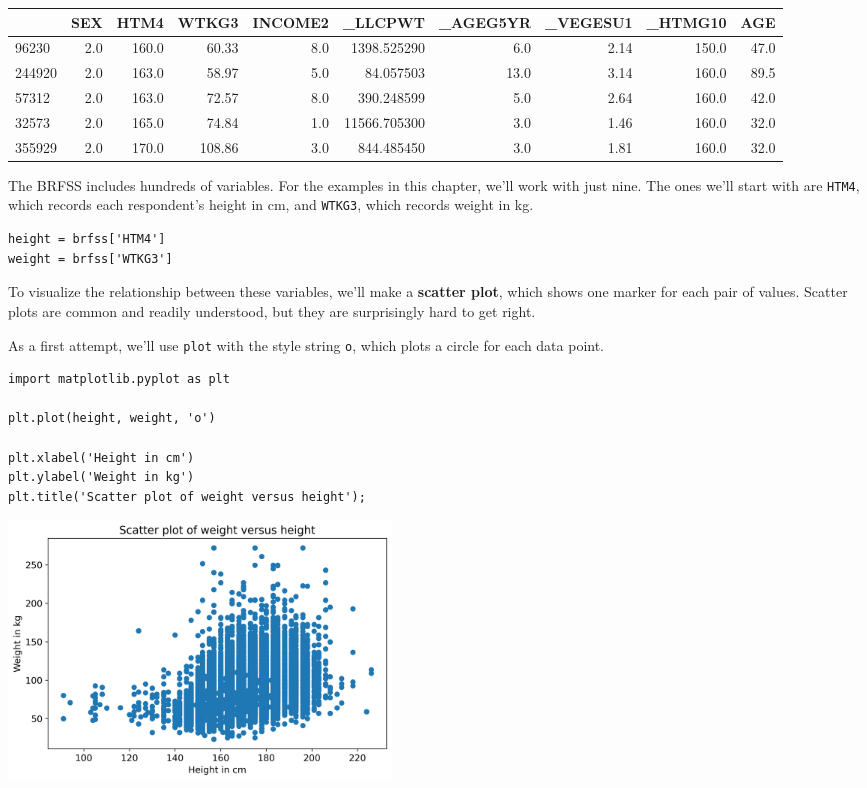 \begin{tabular}{lrrrrrrrrr}
\midrule
{} &  SEX &   HTM4 &   WTKG3 &  INCOME2 &       \_LLCPWT &  \_AGEG5YR &  \_VEGESU1 &  \_HTMG10 &   AGE \\
\midrule
96230  &  2.0 &  160.0 &   60.33 &      8.0 &   1398.525290 &       6.0 &      2.14 &    150.0 &  47.0 \\
244920 &  2.0 &  163.0 &   58.97 &      5.0 &     84.057503 &      13.0 &      3.14 &    160.0 &  89.5 \\
57312  &  2.0 &  163.0 &   72.57 &      8.0 &    390.248599 &       5.0 &      2.64 &    160.0 &  42.0 \\
32573  &  2.0 &  165.0 &   74.84 &      1.0 &  11566.705300 &       3.0 &      1.46 &    160.0 &  32.0 \\
355929 &  2.0 &  170.0 &  108.86 &      3.0 &    844.485450 &       3.0 &      1.81 &    160.0 &  32.0 \\
\midrule
\end{tabular}

The BRFSS includes hundreds of variables. For the examples in this
chapter, we'll work with just nine. The ones we'll start with are
\passthrough{\lstinline!HTM4!}, which records each respondent's height
in cm, and \passthrough{\lstinline!WTKG3!}, which records weight in kg.

\begin{lstlisting}[]
height = brfss['HTM4']
weight = brfss['WTKG3']
\end{lstlisting}

To visualize the relationship between these variables, we'll make a
\textbf{scatter plot}, which shows one marker for each pair of values.
Scatter plots are common and readily understood, but they are
surprisingly hard to get right.

As a first attempt, we'll use \passthrough{\lstinline!plot!} with the
style string \passthrough{\lstinline!o!}, which plots a circle for each
data point.

\begin{lstlisting}[]
import matplotlib.pyplot as plt

plt.plot(height, weight, 'o')

plt.xlabel('Height in cm')
plt.ylabel('Weight in kg')
plt.title('Scatter plot of weight versus height');
\end{lstlisting}

\begin{center}
\includegraphics[width=4in]{chapters/09_relationships_files/09_relationships_12_0.png}
\end{center}

